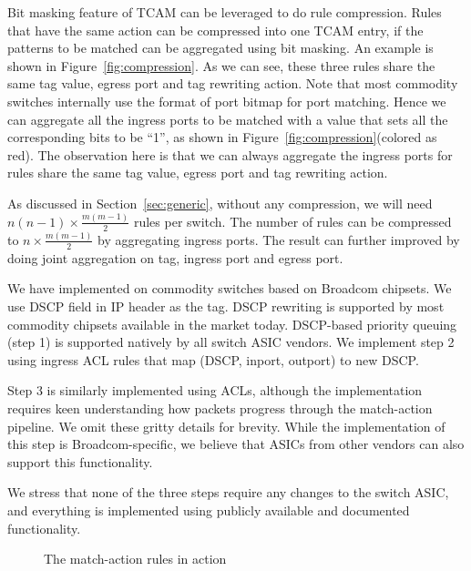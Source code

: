 Bit masking feature of TCAM can be leveraged to do rule compression. Rules that
have the same action can be compressed into one TCAM entry, if the patterns to
be matched can be aggregated using bit masking. An example is shown in
Figure~\ref{fig:compression}.  As we can see, these three rules share the same
tag value, egress port and tag rewriting action. Note that most commodity
switches internally use the format of port bitmap for port matching. Hence we
can aggregate all the ingress ports to be matched with a value that sets all the
corresponding bits to be ``1'', as shown in Figure~\ref{fig:compression}(colored
as red). The observation here is that we can always aggregate the ingress ports
for rules share the same tag value, egress port and tag rewriting action.

As discussed in Section~\ref{sec:generic}, without any compression, we will need
$n(n-1)\times \frac{m(m-1)}{2}$ rules per switch. The number of rules can be
compressed to $n\times \frac{m(m-1)}{2}$ by aggregating ingress ports.  The
result can further improved by doing joint aggregation on tag, ingress port and
egress port.

We have implemented \sysname{} on commodity switches based on Broadcom chipsets.
We use DSCP field in IP header as the tag. DSCP rewriting is supported by most
commodity chipsets available in the market today. DSCP-based priority queuing
(step 1) is supported natively by all switch ASIC vendors. We implement step 2
using ingress ACL rules that map (DSCP, inport, outport) to new DSCP. 

Step 3 is similarly implemented using ACLs, although the implementation requires
keen understanding how packets progress through the match-action pipeline. We
omit these gritty details for brevity. While the implementation of this step is
Broadcom-specific, we believe that ASICs from other vendors can also support
this functionality.

We stress that none of the three steps require any changes to the switch ASIC,
and everything is implemented using publicly available and documented
functionality.

\begin{figure}[t]
	\centering
	
	
	\caption{The match-action rules in action}\label{fig:tagger_demon}
\end{figure}


